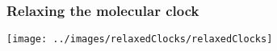 \begin{frame}
\frametitle{Relaxing the molecular clock}

\texttt{[image: ../images/relaxedClocks/relaxedClocks]}

\end{frame}